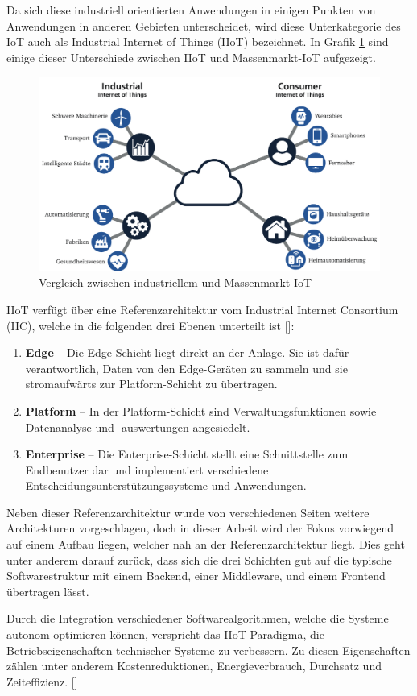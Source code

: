 Da sich diese industriell orientierten Anwendungen in einigen Punkten von Anwendungen in anderen Gebieten unterscheidet, wird diese Unterkategorie des IoT auch als Industrial Internet of Things (IIoT) bezeichnet. In Grafik \ref{fig:IIoT_vs_IoT} sind einige dieser Unterschiede zwischen IIoT und Massenmarkt-IoT aufgezeigt.
%
\begin{figure}[htbp]
	\centering\includegraphics[width=1.0\textwidth]{images/02/IIoT_vs_IoT.pdf}
    \caption{Vergleich zwischen industriellem und Massenmarkt-IoT}
    \label{fig:IIoT_vs_IoT}
\end{figure}

IIoT verfügt über eine Referenzarchitektur vom Industrial Internet Consortium (IIC), welche in die folgenden drei Ebenen unterteilt ist [\cite{iiotReference}]:
\begin{enumerate}
    \item \textbf{Edge} – Die Edge-Schicht liegt direkt an der Anlage. Sie ist dafür verantwortlich, Daten von den Edge-Geräten zu sammeln und sie stromaufwärts zur Platform-Schicht zu übertragen.
    \item \textbf{Platform} – In der Platform-Schicht sind Verwaltungsfunktionen sowie Datenanalyse und -auswertungen angesiedelt.
    \item \textbf{Enterprise} – Die Enterprise-Schicht stellt eine Schnittstelle zum Endbenutzer dar und implementiert verschiedene Entscheidungsunterstützungssysteme und Anwendungen.
\end{enumerate}

Neben dieser Referenzarchitektur wurde von verschiedenen Seiten weitere Architekturen vorgeschlagen, doch in dieser Arbeit wird der Fokus vorwiegend auf einem Aufbau liegen, welcher nah an der Referenzarchitektur liegt. Dies geht unter anderem darauf zurück, dass sich die drei Schichten gut auf die typische Softwarestruktur mit einem Backend, einer Middleware, und einem Frontend übertragen lässt.

Durch die Integration verschiedener Softwarealgorithmen, welche die Systeme autonom optimieren können, verspricht das IIoT-Paradigma, die Betriebseigenschaften technischer Systeme zu verbessern. Zu diesen Eigenschaften zählen unter anderem Kostenreduktionen, Energieverbrauch, Durchsatz und Zeiteffizienz. [\cite{iotApplications}]
 

